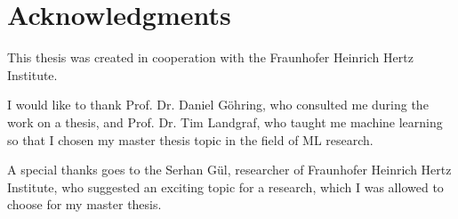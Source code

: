 \chapter*{Acknowledgments}
This thesis was created in cooperation with the Fraunhofer Heinrich Hertz Institute.

I would like to thank Prof. Dr. Daniel Göhring, who consulted me during the work on a thesis, and Prof. Dr. Tim Landgraf, who taught me machine learning so that I chosen my master thesis topic in the field of ML research. 

A special thanks goes to the Serhan Gül, researcher of Fraunhofer Heinrich Hertz Institute, who suggested an exciting topic for a research, which I was allowed to choose for my master thesis.
